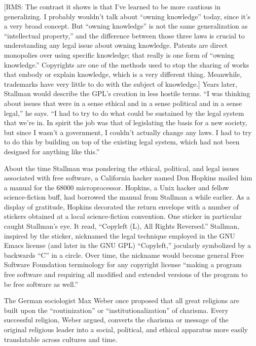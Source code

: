 {[RMS: The contrast it shows is that I've learned to be more cautious in generalizing.  I probably wouldn't talk about ``owning knowledge'' today, since it's a very broad concept.  But ``owning knowledge'' is not the same generalization as ``intellectual property,'' and the difference between those three laws is crucial to understanding any legal issue about owning knowledge.  Patents are direct monopolies over using specific knowledge; that really is one form of ``owning knowledge.'' Copyrights are one of the methods used to stop the sharing of works that embody or explain knowledge, which is a very different thing. Meanwhile, trademarks have very little to do with the subject of knowledge.]} Years later, Stallman would describe the GPL's creation in less hostile terms. ``I was thinking about issues that were in a sense ethical and in a sense political and in a sense legal,'' he says. ``I had to try to do what could be sustained by the legal system that we're in. In spirit the job was that of legislating the basis for a new society, but since I wasn't a government, I couldn't actually change any laws. I had to try to do this by building on top of the existing legal system, which had not been designed for anything like this.''

About the time Stallman was pondering the ethical, political, and legal issues associated with free software, a California hacker named Don Hopkins mailed him a manual for the 68000 microprocessor. Hopkins, a Unix hacker and fellow science-fiction buff, had borrowed the manual from Stallman a while earlier. As a display of gratitude, Hopkins decorated the return envelope with a number of stickers obtained at a local science-fiction convention. One sticker in particular caught Stallman's eye. It read, ``Copyleft (L), All Rights Reversed.''  Stallman, inspired by the sticker, nicknamed the legal technique employed in the GNU Emacs license (and later in the GNU GPL) ``Copyleft,'' jocularly symbolized by a backwards ``C'' in a circle. Over time, the nickname would become general Free Software Foundation terminology for any copyright license ``making a program free software and requiring all modified and extended versions of the program to be free software as well.''

The German sociologist Max Weber once proposed that all great religions are built upon the ``routinization'' or ``institutionalization'' of charisma. Every successful religion, Weber argued, converts the charisma or message of the original religious leader into a social, political, and ethical apparatus more easily translatable across cultures and time.


